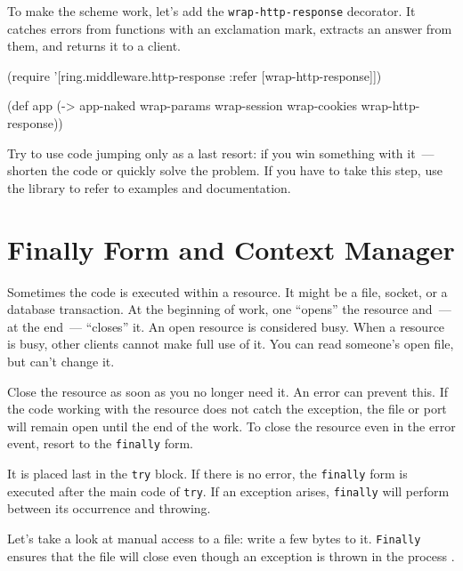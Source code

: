 
To make the scheme work, let's add the \verb|wrap-http-response| decorator. It catches errors from functions with an exclamation mark, extracts an answer from them, and returns it to a client.

\begin{clojure}
(require '[ring.middleware.http-response
           :refer [wrap-http-response]])

(def app
  (-> app-naked
      wrap-params
      wrap-session
      wrap-cookies
      wrap-http-response))
\end{clojure}

Try to use code jumping only as a last resort: if you win something with it~--- shorten the code or quickly solve the problem. If you have to take this step, use the library to refer to examples and documentation.


\section{Finally Form and Context Manager}

Sometimes the code is executed within a resource. It might be a file, socket, or a database transaction. At the beginning of work, one ``opens'' the resource and~--- at the end~--- ``closes'' it. An open resource is considered busy. When a resource is busy, other clients cannot make full use of it. You can read someone's open file, but can't change it.

Close the resource as soon as you no longer need it. An error can prevent this. If the code working with the resource does not catch the exception, the file or port will remain open until the end of the work. To close the resource even in the error event, resort to the \verb|finally| form.

It is placed last in the \verb|try| block. If there is no error, the \verb|finally| form is executed after the main code of \verb|try|. If an exception arises, \verb|finally| will perform between its occurrence and throwing.

Let's take a look at manual access to a file: write a few bytes to it. \verb|Finally| ensures that the file will close even though an exception is thrown in the process .

